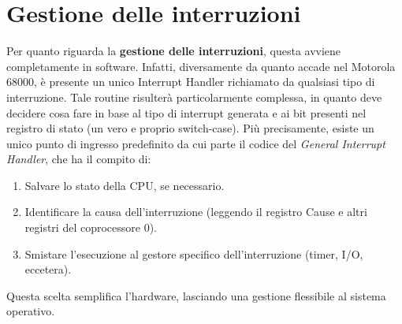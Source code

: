 \section{Gestione delle interruzioni}
Per quanto riguarda la \textbf{gestione delle interruzioni}, questa avviene completamente in software. Infatti, diversamente da quanto accade nel Motorola 68000, è presente un unico Interrupt Handler richiamato da qualsiasi tipo di interruzione. Tale routine risulterà particolarmente complessa, in quanto deve decidere cosa fare in base al tipo di interrupt generata e ai bit presenti nel registro di stato (un vero e proprio switch-case). Più precisamente, esiste un unico punto di ingresso predefinito da cui parte il codice del \textit{General Interrupt Handler}, che ha il compito di:
\begin{enumerate}
	\item Salvare lo stato della CPU, se necessario.
	\item Identificare la causa dell’interruzione (leggendo il registro Cause e altri registri del coprocessore 0).
	\item Smistare l’esecuzione al gestore specifico dell’interruzione (timer, I/O, eccetera).
\end{enumerate}
Questa scelta semplifica l'hardware, lasciando una gestione flessibile al sistema operativo.

